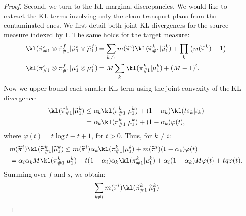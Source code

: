 \begin{proof}
  Second, we turn to the KL marginal discrepancies. We would like to extract the KL terms
  involving only the clean transport plans from the contaminated ones.
  We first detail both joint KL divergences for the source measure indexed by 1.
  The same holds for the target measure:
    \begin{equation}
    \label{seq:kl-split}
    \begin{split}
      &\kl(\widetilde{\pi}^s_{\#1} \otimes \widetilde{\pi}^f_{\#1} \vert \widetilde{\mu}^s_1 \otimes \widetilde{\mu}^f_1) =
      \sum_{k \neq i} m(\widetilde{\pi}^i) \kl(\widetilde{\pi}^k_{\#1} \vert \widetilde{\mu}^k_1) +
      \prod_{k} \big( m(\widetilde{\pi}^k) - 1 \big)\\
      &
      \kl(\pi^s_{\#1} \otimes \pi^f_{\#1} \vert \mu^s_1 \otimes \mu^f_1) =
    M \sum_k \kl(\pi^k_{\#1} \vert \mu^k_1) + (M-1)^2.
      \end{split}
    \end{equation}
    Now we upper bound each smaller KL term using the joint convexity of the KL divergence:
    \begin{equation*}
      \begin{split}
        \kl(\widetilde{\pi}^k_{\#1} \vert \widetilde{\mu}^k_1) &\leq
        \alpha_k \kl(\pi^k_{\#1} \vert \mu^k_1) + (1 - \alpha_k) \kl(t \varepsilon_k \vert \varepsilon_k) \\
        &= \alpha_k \kl(\pi^k_{\#1} \vert \mu^k_1) + (1 - \alpha_k) \varphi(t),
      \end{split}
    \end{equation*}
    where $\varphi(t) = t \log t - t + 1$, for $t > 0$. Thus, for $k\neq i$:
    \begin{equation*}
      \begin{split}
        &m(\widetilde{\pi}^i) \kl(\widetilde{\pi}^k_{\#1} \vert \widetilde{\mu}^k_1)
        \leq m(\widetilde{\pi}^i) \alpha_k \kl(\pi^k_{\#1} \vert \mu^k_1)
        + m(\widetilde{\pi}^i) (1 - \alpha_k) \varphi(t) \\
        &= \alpha_i\alpha_k M \kl(\pi^k_{\#1} \vert \mu^k_1)
        + t (1-\alpha_i) \alpha_k \kl(\pi^k_{\#1} \vert \mu^k_1)
        + \alpha_i(1-\alpha_k) M \varphi(t) + t q\varphi(t).
      \end{split}
    \end{equation*}
    Summing over $f$ and $s$, we obtain:
    \begin{equation*}
      \begin{split}
        &\sum_{k \neq i} m(\widetilde{\pi}^i) \kl(\widetilde{\pi}^k_{\#1} \vert \widetilde{\mu}^k_1) \\

\end{split}
\end{equation*}
\end{proof}
